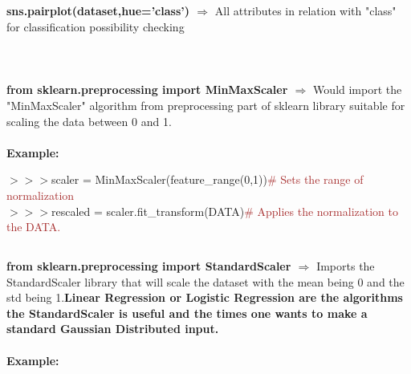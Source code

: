 \documentclass[a4paper,18pt]{article}
\begin{document}
\subsection{\colorbox {matgreen}{\color{white}{\large Scatter Matrix II}}}
\textbf{sns.pairplot(dataset,hue='class') $\Rightarrow$} All attributes in relation with "class" for classification possibility checking\\\\


\newpage

\section{\colorbox {Abi}{}}
\subsection{\colorbox {matgreen}{\color{white}{\large from sklearn.preprocessing import MinMaxScaler}}}
\textbf{from sklearn.preprocessing import MinMaxScaler $\Rightarrow$} Would import the "MinMaxScaler" algorithm from preprocessing part of sklearn library suitable for scaling the data between 0 and 1.\\\\
\textbf{Example:\\}

$>>>$scaler = MinMaxScaler(feature\_range(0,1)){\textcolor{brown}{\# Sets the range of normalization}}\\

$>>>$rescaled = scaler.fit\_transform(DATA){\textcolor{brown}{\# Applies the normalization to the DATA.}}\\


\subsection{\colorbox {matgreen}{\color{white}{\large from sklearn.preprocessing import StandardScaler}}}
\textbf{from sklearn.preprocessing import StandardScaler $\Rightarrow$} Imports the StandardScaler library that will scale the dataset with the mean being 0 and the std being 1.{\textbf{\textcolor{important}{Linear Regression or Logistic Regression are the algorithms the StandardScaler is useful and the times one wants to make a standard Gaussian Distributed input.}}}\\\\
\textbf{Example:\\}
\end{document}
